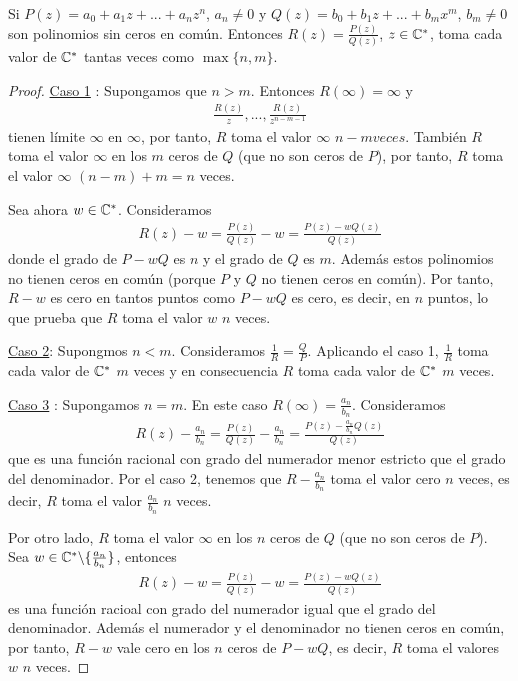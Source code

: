 \begin{prop}
    Si $P(z) = a_0 + a_1z + ... + a_nz^n$, $a_n \not = 0$ y $Q(z) = b_0 + b_1z + ... + b_mx^m$, $b_m \not = 0$ son polinomios sin ceros en común. Entonces $R(z) = \frac{P(z)}{Q(z)}$, $z \in \mathbb{C}^*$, toma cada valor de $\mathbb{C}^*$ tantas veces como $\max\{n,m\}$.
\end{prop}

\begin{proof}
    \underline{Caso 1} : Supongamos que $n > m$. Entonces $R(\infty) = \infty$ y
    \begin{align*}
        \frac{R(z)}{z}, ..., \frac{R(z)}{z^{n - m - 1}}
    \end{align*}
    tienen límite $\infty$ en $\infty$, por tanto, $R$ toma el valor $\infty$ $n -m veces$. También $R$ toma el valor $\infty$ en los $m$ ceros de $Q$ (que no son ceros de $P$), por tanto, $R$ toma el valor $\infty$ $(n - m) + m = n$ veces.

    Sea ahora $w \in \mathbb{C}^*$. Consideramos
    \begin{align*}
        R(z) - w = \frac{P(z)}{Q(z)} - w = \frac{P(z) - wQ(z)}{Q(z)}
    \end{align*}
    donde el grado de $P - wQ$ es $n$ y el grado de $Q$ es $m$. Además estos polinomios no tienen ceros en común (porque $P$ y $Q$ no tienen ceros en común). Por tanto, $R - w$ es cero en tantos puntos como $P - wQ$ es cero, es decir, en $n$ puntos, lo que prueba que $R$ toma el valor $w$ $n$ veces.

    \underline{Caso 2}: Supongmos $n < m$. Consideramos $\frac{1}{R} = \frac{Q}{P}$. Aplicando el caso 1, $\frac{1}{R}$ toma cada valor de $\mathbb{C}^*$ $m$ veces y en consecuencia $R$ toma cada valor de $\mathbb{C}^*$ $m$ veces.

    \underline{Caso 3} : Supongamos $n = m$. En este caso $R(\infty) = \frac{a_n}{b_n}$. Consideramos
    \begin{align*}
        R(z) - \frac{a_n}{b_n} = \frac{P(z)}{Q(z)} - \frac{a_n}{b_n} = \frac{P(z) - \frac{a_n}{b_n}Q(z)}{Q(z)}
    \end{align*}
    que es una función racional con grado del numerador menor estricto que el grado del denominador. Por el caso 2, tenemos que $R - \frac{a_n}{b_n}$ toma el valor cero $n$ veces, es decir, $R$ toma el valor $\frac{a_n}{b_n}$ $n$ veces.

    Por otro lado, $R$ toma el valor $\infty$ en los $n$ ceros de $Q$ (que no son ceros de $P$). Sea $w \in \mathbb{C}^* \backslash \{ \frac{a_n}{b_n} \}$, entonces
    \begin{align*}
        R(z) - w = \frac{P(z)}{Q(z)} - w = \frac{P(z) - wQ(z)}{Q(z)}
    \end{align*}
    es una función racioal con grado del numerador igual que el grado del denominador. Además el numerador y el denominador no tienen ceros en común, por tanto, $R - w$ vale cero en los $n$ ceros de $P - wQ$, es decir, $R$ toma el valores $w$ $n$ veces.
\end{proof}
